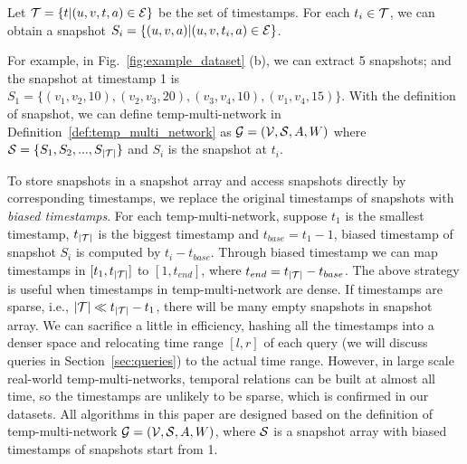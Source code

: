 \documentclass[10pt,journal,compsoc]{IEEEtran}
\begin{document}
\begin{definition}[Snapshot]
	\label{def:snapshot}
	Let $\mathcal{T}=\{t|(u, v, t, a)\in \mathcal{E}\}$ be the set of timestamps. For each $t_i\in \mathcal{T}$, we can obtain a snapshot $S_i=\{(u,v,a)|(u,v,t_i,a)\in \mathcal{E}\}$.
\end{definition}

For example, in Fig.~\ref{fig:example_dataset} (b), we can extract 5 snapshots; and the snapshot at timestamp 1 is $ S_1=\{(v_1,v_2,10),(v_2,v_3,20),(v_3,v_4,10),(v_1,v_4,15)\} $. With the definition of snapshot, we can define temp-multi-network in Definition~\ref{def:temp_multi_network} as $\mathcal{G}=(\mathcal{V},\mathcal{S},A,W)$ where $\mathcal{S}=\{S_1,S_2,...,S_{|\mathcal{T}|}\}$ and $ S_i $ is the snapshot at $t_i$.

 To store snapshots in a snapshot array and access snapshots directly by corresponding timestamps, we replace the original timestamps of snapshots with \emph{biased timestamps}. For each temp-multi-network, suppose $ t_1 $ is the smallest timestamp, $ t_{|\mathcal{T}|} $ is the biggest timestamp and $ t_{base}=t_1-1 $, biased timestamp of snapshot $ S_i $ is computed by $ t_i-t_{base} $. Through biased timestamp we can map timestamps in $ [t_1,t_{|\mathcal{T}|}] $ to $ [1,t_{end}] $, where $ t_{end}=t_{|\mathcal{T}|}-t_{base} $. The above strategy is useful when timestamps in temp-multi-network are dense. If timestamps are sparse, i.e., $ |\mathcal{T}| \ll t_{|\mathcal{T}|}-t_1 $, there will be many empty snapshots in snapshot array. We can sacrifice a little in efficiency, hashing all the timestamps into a denser space and relocating time range $ [l,r] $ of each query (we will discuss queries in Section~\ref{sec:queries}) to the actual time range. However, in large scale real-world temp-multi-networks, temporal relations can be built at almost all time, so the timestamps are unlikely to be sparse, which is confirmed in our datasets. All algorithms in this paper are designed based on the definition of temp-multi-network $\mathcal{G}=(\mathcal{V},\mathcal{S},A,W)$, where $ \mathcal{S} $ is a snapshot array with biased timestamps of snapshots start from 1.
\end{document}
